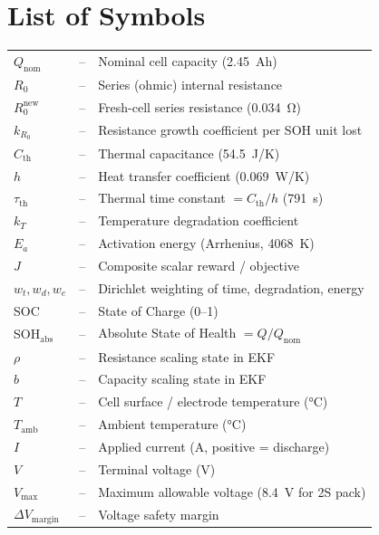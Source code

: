 \documentclass[a4paper, 12pt]{report}
\theoremstyle{definition}
\begin{document}
\newpage
\section*{{\huge List of Symbols}\hfill}
\vspace{1.2cm}
\begin{tabular}{lll}
$Q_{\mathrm{nom}}$   & -- & Nominal cell capacity (\SI{2.45}{Ah}) \\
$R_0$                & -- & Series (ohmic) internal resistance \\
$R_0^{\mathrm{new}}$ & -- & Fresh-cell series resistance (\SI{0.034}{\ohm}) \\
$k_{R_0}$            & -- & Resistance growth coefficient per SOH unit lost \\
$C_{\mathrm{th}}$    & -- & Thermal capacitance (\SI{54.5}{J/K}) \\
$h$                  & -- & Heat transfer coefficient (\SI{0.069}{W/K}) \\
$\tau_{\mathrm{th}}$ & -- & Thermal time constant $= C_{\mathrm{th}}/h$ (\SI{791}{s}) \\
$k_T$                & -- & Temperature degradation coefficient \\
$E_a$                & -- & Activation energy (Arrhenius, \SI{4068}{K}) \\
$J$                  & -- & Composite scalar reward / objective \\
$w_t, w_d, w_e$      & -- & Dirichlet weighting of time, degradation, energy \\
SOC                  & -- & State of Charge (0--1) \\
SOH$_{\mathrm{abs}}$ & -- & Absolute State of Health $= Q/Q_{\mathrm{nom}}$ \\
$\rho$               & -- & Resistance scaling state in EKF \\
$b$                  & -- & Capacity scaling state in EKF \\
$T$                  & -- & Cell surface / electrode temperature (\si{\degreeCelsius}) \\
$T_{\mathrm{amb}}$   & -- & Ambient temperature (\si{\degreeCelsius}) \\
$I$                  & -- & Applied current (\si{A}, positive = discharge) \\
$V$                  & -- & Terminal voltage (\si{V}) \\
$V_{\mathrm{max}}$   & -- & Maximum allowable voltage (\SI{8.4}{V} for 2S pack) \\
$\Delta V_{\mathrm{margin}}$ & -- & Voltage safety margin \\
\end{tabular}
\end{document}
